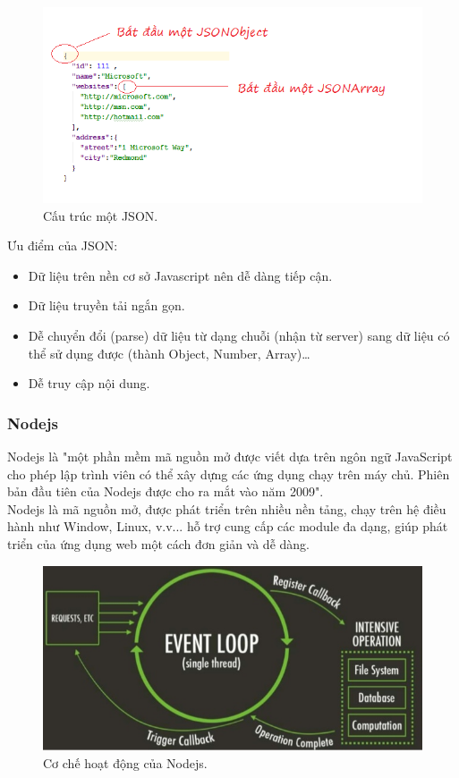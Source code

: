 \documentclass[a4paper,12pt,oneside]{article}
\begin{document}
\begin{figure}[H]
	\centering
	\includegraphics[scale=.8]{hinh/json.png}
	\caption{Cấu trúc một JSON\cite{json}.}
	\label{fig:json}
\end{figure}

Ưu điểm của JSON:
\begin{itemize}
\item Dữ liệu trên nền cơ sở Javascript nên dễ dàng tiếp cận.
\item Dữ liệu truyền tải ngắn gọn.
\item Dễ chuyển đổi (parse) dữ liệu từ dạng chuỗi (nhận từ server) sang dữ liệu có thể sử dụng được (thành Object, Number, Array)…
\item Dễ truy cập nội dung.
\end{itemize}

\subsubsection{Nodejs}
\noindent Nodejs là "một phần mềm mã nguồn mở được viết dựa trên ngôn ngữ JavaScript cho phép lập trình viên có thể xây dựng các ứng dụng chạy trên máy chủ. Phiên bản đầu tiên của Nodejs được cho ra mắt vào năm 2009"\cite{nodejs}.\\
Nodejs là mã nguồn mở, được phát triển trên nhiều nền tảng, chạy trên hệ điều hành như Window, Linux, v.v...  hỗ trợ cung cấp các module đa dạng, giúp phát triển của ứng dụng web một cách đơn giản và dễ dàng.

\begin{figure}[H]
	\centering
	\includegraphics[scale=.8]{hinh/nodejs.png}
	\caption{Cơ chế hoạt động của Nodejs\cite{nodejs}.}
	\label{fig:nodejs}
\end{figure}
\end{document}
